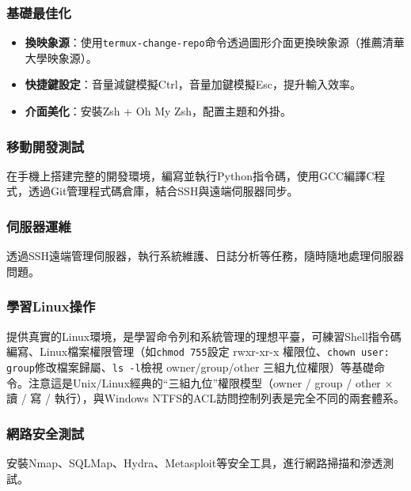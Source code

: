 \subsubsection*{基礎最佳化}

\begin{itemize}
  \item \textbf{換映象源}：使用\texttt{termux-\allowbreak change-\allowbreak repo}命令透過圖形介面更換映象源（推薦清華大學映象源）。
  \item \textbf{快捷鍵設定}：音量減鍵模擬Ctrl，音量加鍵模擬Esc，提升輸入效率。
  \item \textbf{介面美化}：安裝Zsh + Oh My Zsh，配置主題和外掛。
\end{itemize}


\subsubsection*{移動開發測試}

在手機上搭建完整的開發環境，編寫並執行Python指令碼，使用GCC編譯C程式，透過Git管理程式碼倉庫，結合SSH與遠端伺服器同步。

\subsubsection*{伺服器運維}

透過SSH遠端管理伺服器，執行系統維護、日誌分析等任務，隨時隨地處理伺服器問題。

\subsubsection*{學習Linux操作}

提供真實的Linux環境，是學習命令列和系統管理的理想平臺，可練習Shell指令碼編寫、Linux檔案權限管理（如\texttt{chmod 755}設定 rwxr-xr-x 權限位、\texttt{chown user: group}修改檔案歸屬、\texttt{ls -\allowbreak l}檢視 owner/group/other 三組九位權限）等基礎命令。注意這是Unix/Linux經典的“三組九位”權限模型（owner / group / other × 讀 / 寫 / 執行），與Windows NTFS的ACL訪問控制列表是完全不同的兩套體系。

\subsubsection*{網路安全測試}

安裝Nmap、SQLMap、Hydra、Metasploit等安全工具，進行網路掃描和滲透測試。

